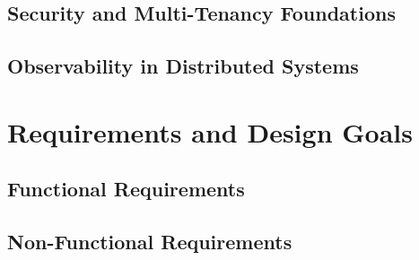\documentclass[a4paper,twoside]{sapthesis}
\begin{document}
\section{Security and Multi-Tenancy Foundations}
\label{sec:security-foundations}

\section{Observability in Distributed Systems}
\label{sec:observability-background}


\chapter{Requirements and Design Goals}
\label{ch:requirements}


\section{Functional Requirements}
\label{sec:functional-requirements}

\section{Non-Functional Requirements}
\label{sec:nonfunctional-requirements}
\end{document}
